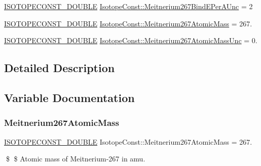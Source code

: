 \begin{DoxyCompactItemize}
\mbox{\hyperlink{group___isotope_const-_macros_ga8f45a7272ce02c0b4c65c44636ed719a}{I\+S\+O\+T\+O\+P\+E\+C\+O\+N\+S\+T\+\_\+\+D\+O\+U\+B\+LE}} \mbox{\hyperlink{group___isotope_const-_meitnerium-_mt267_gaed5337a263e983bcf62c950ef7bb8015}{Isotope\+Const\+::\+Meitnerium267\+Bind\+E\+Per\+A\+Unc}} = 2
\item 
\mbox{\hyperlink{group___isotope_const-_macros_ga8f45a7272ce02c0b4c65c44636ed719a}{I\+S\+O\+T\+O\+P\+E\+C\+O\+N\+S\+T\+\_\+\+D\+O\+U\+B\+LE}} \mbox{\hyperlink{group___isotope_const-_meitnerium-_mt267_ga47a1614cf1024e95637b9c7c19b97a7b}{Isotope\+Const\+::\+Meitnerium267\+Atomic\+Mass}} = 267.
\item 
\mbox{\hyperlink{group___isotope_const-_macros_ga8f45a7272ce02c0b4c65c44636ed719a}{I\+S\+O\+T\+O\+P\+E\+C\+O\+N\+S\+T\+\_\+\+D\+O\+U\+B\+LE}} \mbox{\hyperlink{group___isotope_const-_meitnerium-_mt267_gad56d7b28e8629fa7ef45d6134fb9e108}{Isotope\+Const\+::\+Meitnerium267\+Atomic\+Mass\+Unc}} = 0.
\end{DoxyCompactItemize}


\subsection{Detailed Description}


\subsection{Variable Documentation}
\mbox{\label{group___isotope_const-_meitnerium-_mt267_ga47a1614cf1024e95637b9c7c19b97a7b}} 
\subsubsection{\texorpdfstring{Meitnerium267\+Atomic\+Mass}{Meitnerium267AtomicMass}}
{\footnotesize\ttfamily \mbox{\hyperlink{group___isotope_const-_macros_ga8f45a7272ce02c0b4c65c44636ed719a}{I\+S\+O\+T\+O\+P\+E\+C\+O\+N\+S\+T\+\_\+\+D\+O\+U\+B\+LE}} Isotope\+Const\+::\+Meitnerium267\+Atomic\+Mass = 267.}

\$ \$ Atomic mass of Meitnerium-\/267 in amu. \mbox{\label{group___isotope_const-_meitnerium-_mt267_gad56d7b28e8629fa7ef45d6134fb9e108}} 
